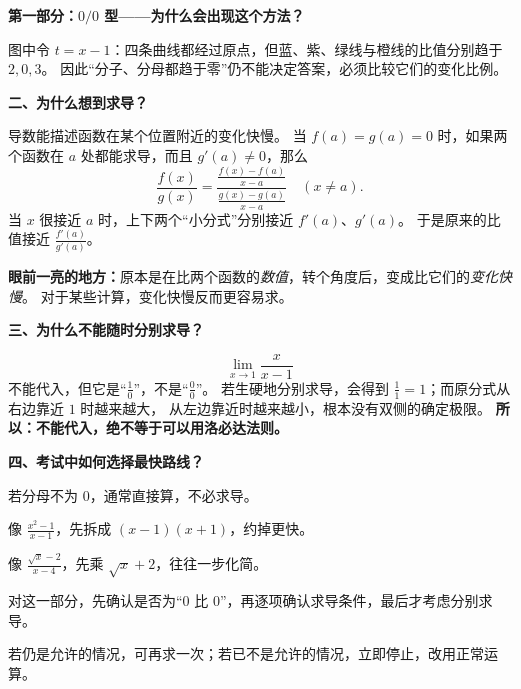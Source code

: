 \clearpage
\begin{explanationbox}

\begin{minipage}{\linewidth}
\textbf{\textcolor{CExplanation}{第一部分：$0/0$ 型——为什么会出现这个方法？}}
\begin{center}\end{center}
\end{minipage}



图中令 $t=x-1$：四条曲线都经过原点，但蓝、紫、绿线与橙线的比值分别趋于 $2,0,3$。
因此“分子、分母都趋于零”仍不能决定答案，必须比较它们的变化比例。

\medskip
\textbf{\textcolor{CExplanation}{二、为什么想到求导？}}

导数能描述函数在某个位置附近的变化快慢。
当 $f(a)=g(a)=0$ 时，如果两个函数在 $a$ 处都能求导，而且 $g'(a)\ne0$，那么
\[
\frac{f(x)}{g(x)}
=\frac{\frac{f(x)-f(a)}{x-a}}{\frac{g(x)-g(a)}{x-a}}
\quad(x\ne a).
\]
当 $x$ 很接近 $a$ 时，上下两个“小分式”分别接近 $f'(a)$、$g'(a)$。
于是原来的比值接近 $\frac{f'(a)}{g'(a)}$。

\textbf{眼前一亮的地方：}原本是在比两个函数的\emph{数值}，转个角度后，变成比它们的\emph{变化快慢}。
对于某些计算，变化快慢反而更容易求。

\medskip
\textbf{\textcolor{CExplanation}{三、为什么不能随时分别求导？}}

\[
\lim_{x\to1}\frac{x}{x-1}
\]
不能代入，但它是“$\frac10$”，不是“$\frac00$”。
若生硬地分别求导，会得到 $\frac11=1$；而原分式从右边靠近 $1$ 时越来越大，
从左边靠近时越来越小，根本没有双侧的确定极限。
\textbf{所以：不能代入，绝不等于可以用洛必达法则。}

\medskip
\begin{minipage}{\linewidth}
\textbf{\textcolor{CExplanation}{四、考试中如何选择最快路线？}}

\begin{description}[style=nextline, leftmargin=2.5em, labelsep=0.4em, itemsep=0.35em]
    \item[\textbf{先直接代入：}] 若分母不为 $0$，通常直接算，不必求导。
    \item[\textbf{有共同因子：}] 像 $\frac{x^2-1}{x-1}$，先拆成 $(x-1)(x+1)$，约掉更快。
    \item[\textbf{含根号：}] 像 $\frac{\sqrt{x}-2}{x-4}$，先乘 $\sqrt{x}+2$，往往一步化简。
    \item[\textbf{拆不开、难化简：}] 对这一部分，先确认是否为“$0$ 比 $0$”，再逐项确认求导条件，最后才考虑分别求导。
    \item[\textbf{求导一次还不能算：}] 若仍是允许的情况，可再求一次；若已不是允许的情况，立即停止，改用正常运算。
\end{description}
\end{minipage}


\end{explanationbox}
